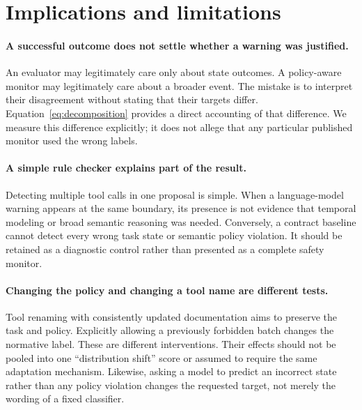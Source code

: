 \documentclass[10pt]{article}
\begin{document}

\begin{table}[t]
\centering\small
\caption{Exploratory matched-prefix ablation. The strict repeat, relaxed batch policy and outcome-focused prompt share the same tools and recorded conversation. Eligibility and all selected cells are retained in the artifact.}
\label{tab:ablation}

\end{table}










\section{Implications and limitations}
\label{sec:discussion}
\paragraph{A successful outcome does not settle whether a warning was justified.}
An evaluator may legitimately care only about state outcomes. A policy-aware monitor may legitimately care about a broader event. The mistake is to interpret their disagreement without stating that their targets differ. Equation~\ref{eq:decomposition} provides a direct accounting of that difference. We measure this difference explicitly; it does not allege that any particular published monitor used the wrong labels.

\paragraph{A simple rule checker explains part of the result.}
Detecting multiple tool calls in one proposal is simple. When a language-model warning appears at the same boundary, its presence is not evidence that temporal modeling or broad semantic reasoning was needed. Conversely, a contract baseline cannot detect every wrong task state or semantic policy violation. It should be retained as a diagnostic control rather than presented as a complete safety monitor.

\paragraph{Changing the policy and changing a tool name are different tests.}
Tool renaming with consistently updated documentation aims to preserve the task and policy. Explicitly allowing a previously forbidden batch changes the normative label. These are different interventions. Their effects should not be pooled into one ``distribution shift'' score or assumed to require the same adaptation mechanism. Likewise, asking a model to predict an incorrect state rather than any policy violation changes the requested target, not merely the wording of a fixed classifier.
\end{document}
